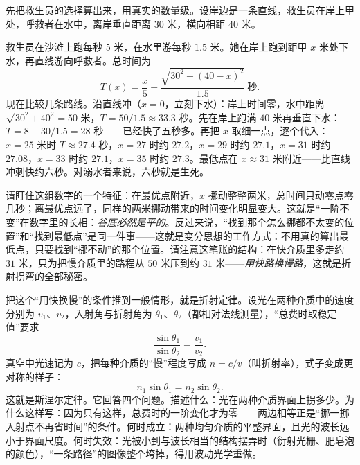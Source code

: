 \begin{mainline}
先把救生员的选择算出来，用真实的数量级。设岸边是一条直线，救生员在岸上甲处，呼救者在水中，离岸垂直距离 \(30\) 米，横向相距 \(40\) 米。

\begin{center}
\end{center}

救生员在沙滩上跑每秒 \(5\) 米，在水里游每秒 \(1.5\) 米。她在岸上跑到距甲 \(x\) 米处下水，再直线游向呼救者。总时间为
\[
  T(x)=\frac{x}{5}+\frac{\sqrt{30^2+(40-x)^2}}{1.5}\ \text{秒}.
\]
现在比较几条路线。沿直线冲（\(x=0\)，立刻下水）：岸上时间零，水中距离 \(\sqrt{30^2+40^2}=50\) 米，\(T=50/1.5\approx 33.3\) 秒。先在岸上跑满 \(40\) 米再垂直下水：\(T=8+30/1.5=28\) 秒——已经快了五秒多。再把 \(x\) 取细一点，逐个代入：\(x=25\) 米时 \(T\approx27.4\) 秒，\(x=27\) 时约 \(27.2\)，\(x=29\) 时约 \(27.1\)，\(x=31\) 时约 \(27.08\)，\(x=33\) 时约 \(27.1\)，\(x=35\) 时约 \(27.3\)。最低点在 \(x\approx31\) 米附近——比直线冲刺快约六秒。对溺水者来说，六秒就是生死。

请盯住这组数字的一个特征：在最优点附近，\(x\) 挪动整整两米，总时间只动零点零几秒；离最优点远了，同样的两米挪动带来的时间变化明显变大。这就是“一阶不变”在数字里的长相：\emph{谷底必然是平的}。反过来说，“找到那个怎么挪都不太变的位置”和“找到最低点”是同一件事——这就是变分思想的工作方式：不用真的算出最低点，只要找到“挪不动”的那个位置。请注意这笔账的结构：在快介质里多走约 \(31\) 米，只为把慢介质里的路程从 \(50\) 米压到约 \(31\) 米——\emph{用快路换慢路}，这就是折射拐弯的全部秘密。

把这个“用快换慢”的条件推到一般情形，就是折射定律。设光在两种介质中的速度分别为 \(v_1\)、\(v_2\)，入射角与折射角为 \(\theta_1\)、\(\theta_2\)（都相对法线测量），“总费时取稳定值”要求
\[
  \frac{\sin\theta_1}{\sin\theta_2}=\frac{v_1}{v_2}.
\]
真空中光速记为 \(c\)，把每种介质的“慢”程度写成 \(n=c/v\)（叫折射率），式子变成更对称的样子：
\[
  n_1\sin\theta_1=n_2\sin\theta_2.
\]
这就是斯涅尔定律。它回答四个问题。描述什么：光在两种介质界面上拐多少。为什么这样写：因为只有这样，总费时的一阶变化才为零——两边相等正是“挪一挪入射点不再省时间”的条件。何时成立：两种均匀介质的平整界面，且光的波长远小于界面尺度。何时失效：光被小到与波长相当的结构摆弄时（衍射光栅、肥皂泡的颜色），“一条路径”的图像整个垮掉，得用波动光学重做。


\end{mainline}

